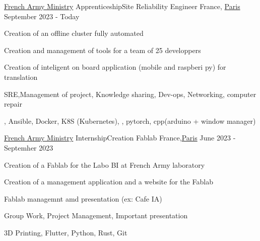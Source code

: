 

\begin{cventries}

	\cventry
	{\href{https://www.defense.gouv.fr/}{French Army Ministry}}
	{Apprenticeship{\enskip\cdotp\enskip}Site Reliability Engineer} %
	{France, \href{https://www.paris.fr/}{Paris}} %
	{September 2023 - Today} %
	{
		\begin{cvitems} %
			\item {Creation of an offline cluster fully automated}
			\item {Creation and management of tools for a team of 25 developpers}
			\item {Creation of inteligent on board application (mobile and raspberi py) for translation}
		\end{cvitems}
	}
	{
		\begin{cvitemsskills} %
			\item {SRE,Management of project, Knowledge sharing, Dev-ops, Networking, computer repair}
			\item {\linux, Ansible, Docker, K8S (Kubernetes), \python, pytorch, cpp(arduino + window manager)}
		\end{cvitemsskills}
	}

	\cventry
	{\href{https://www.defense.gouv.fr/}{French Army Ministry}}
    {Internship{\enskip\cdotp\enskip}Creation Fablab} %
	{France,\href{https://www.paris.fr/}{Paris}} %
	{June 2023 - Septemher 2023} %
	{
		\begin{cvitems} %
			\item {Creation of a Fablab for the Labo BI at French Army laboratory}
			\item {Creation of a management application and a website for the Fablab}
			\item {Fablab managemnt amd presentation (ex: Cafe IA)}
		\end{cvitems}
	}
	{
		\begin{cvitemsskills} %
			\item {Group Work, Project Management, Important presentation}
			\item {3D Printing, Flutter, Python, Rust, Git }
		\end{cvitemsskills}
	}


\end{cventries}
